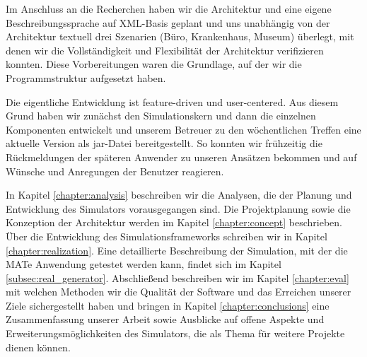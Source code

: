 Im Anschluss an die Recherchen haben wir die Architektur und eine eigene Beschreibungssprache auf XML-Basis geplant und uns unabhängig von der Architektur textuell drei Szenarien (Büro, Krankenhaus, Museum) überlegt, mit denen wir die Vollständigkeit und Flexibilität der Architektur verifizieren konnten. Diese Vorbereitungen waren die Grundlage, auf der wir die Programmstruktur aufgesetzt haben.

Die eigentliche Entwicklung ist feature-driven und user-centered. Aus diesem Grund haben wir zunächst den Simulationskern und dann die einzelnen Komponenten entwickelt und unserem Betreuer zu den wöchentlichen Treffen eine aktuelle Version als jar-Datei bereitgestellt. So konnten wir frühzeitig die Rückmeldungen der späteren Anwender zu unseren Ansätzen bekommen und auf Wünsche und Anregungen der Benutzer reagieren.



In Kapitel \ref{chapter:analysis} beschreiben wir die Analysen, die der Planung und Entwicklung des Simulators vorausgegangen sind.
Die Projektplanung sowie die Konzeption der Architektur werden im Kapitel \ref{chapter:concept} beschrieben.
Über die Entwicklung des Simulationsframeworks schreiben wir in Kapitel \ref{chapter:realization}.
Eine detaillierte Beschreibung der Simulation, mit der die MATe Anwendung getestet werden kann, findet sich im Kapitel \ref{subsec:real_generator}.
Abschließend beschreiben wir im Kapitel \ref{chapter:eval} mit welchen Methoden wir die Qualität der Software und das Erreichen unserer Ziele sichergestellt haben und bringen in Kapitel \ref{chapter:conclusions} eine Zusammenfassung unserer Arbeit sowie Ausblicke auf offene Aspekte und Erweiterungsmöglichkeiten des Simulators, die als Thema für weitere Projekte dienen können.



